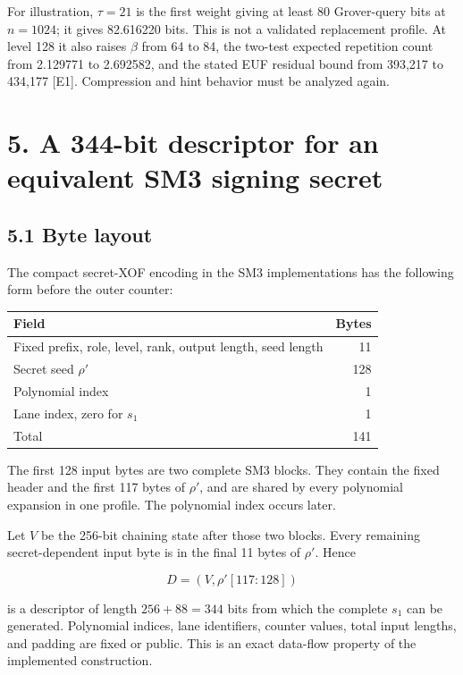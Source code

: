 \documentclass[
  american,
  10pt,
  a4paper,
]{article}
\newcounter{none} %
\begin{document}
For illustration, \(\tau=21\) is the first weight giving at least 80
Grover-query bits at \(n=1024\); it gives 82.616220 bits. This is not a
validated replacement profile. At level 128 it also raises \(\beta\)
from 64 to 84, the two-test expected repetition count from 2.129771 to
2.692582, and the stated EUF residual bound from 393,217 to 434,177
{[}E1{]}. Compression and hint behavior must be analyzed again.

\section{5. A 344-bit descriptor for an equivalent SM3 signing
secret}\label{a-344-bit-descriptor-for-an-equivalent-sm3-signing-secret}

\subsection{5.1 Byte layout}\label{byte-layout}

The compact secret-XOF encoding in the SM3 implementations has the
following form before the outer counter:

{\def\LTcaptype{none} %
\begin{longtable}[]{@{}lr@{}}
\toprule\noalign{}
Field & Bytes \\
\midrule\noalign{}
\endhead
\bottomrule\noalign{}
\endlastfoot
Fixed prefix, role, level, rank, output length, seed length & 11 \\
Secret seed \(\rho'\) & 128 \\
Polynomial index & 1 \\
Lane index, zero for \(s_1\) & 1 \\
Total & 141 \\
\end{longtable}
}

The first 128 input bytes are two complete SM3 blocks. They contain the
fixed header and the first 117 bytes of \(\rho'\), and are shared by
every polynomial expansion in one profile. The polynomial index occurs
later.

Let \(V\) be the 256-bit chaining state after those two blocks. Every
remaining secret-dependent input byte is in the final 11 bytes of
\(\rho'\). Hence

\[
D=(V,\rho'[117:128])
\]

is a descriptor of length \(256+88=344\) bits from which the complete
\(s_1\) can be generated. Polynomial indices, lane identifiers, counter
values, total input lengths, and padding are fixed or public. This is an
exact data-flow property of the implemented construction.
\end{document}

